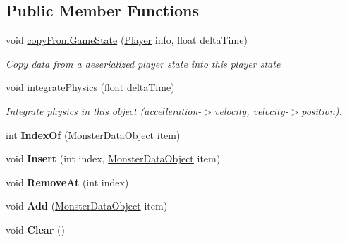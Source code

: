 \subsection*{Public Member Functions}
\begin{DoxyCompactItemize}
\item 
void \hyperlink{class_game_state_1_1_player_ace7e3625cf1996b8c56bcafae36673af}{copy\-From\-Game\-State} (\hyperlink{class_game_state_1_1_player}{Player} info, float delta\-Time)
\begin{DoxyCompactList}\small\item\em Copy data from a deserialized player state into this player state \end{DoxyCompactList}\item 
void \hyperlink{class_game_state_1_1_player_a59ac624b5378e8253ac70d827febfe6a}{integrate\-Physics} (float delta\-Time)
\begin{DoxyCompactList}\small\item\em Integrate physics in this object (accelleration-\/$>$velocity, velocity-\/$>$position). \end{DoxyCompactList}\item 
\hypertarget{class_game_state_1_1_player_a3ab6c2f1d15057b161ba0cba271fd9d3}{int {\bfseries Index\-Of} (\hyperlink{class_monster_data_object}{Monster\-Data\-Object} item)}\label{class_game_state_1_1_player_a3ab6c2f1d15057b161ba0cba271fd9d3}

\item 
\hypertarget{class_game_state_1_1_player_a84cdeefa239fade5ab90b42b3d55bda8}{void {\bfseries Insert} (int index, \hyperlink{class_monster_data_object}{Monster\-Data\-Object} item)}\label{class_game_state_1_1_player_a84cdeefa239fade5ab90b42b3d55bda8}

\item 
\hypertarget{class_game_state_1_1_player_a971bad69d0ef56fbd860c71ed1b56dae}{void {\bfseries Remove\-At} (int index)}\label{class_game_state_1_1_player_a971bad69d0ef56fbd860c71ed1b56dae}

\item 
\hypertarget{class_game_state_1_1_player_ad791ddd2f697e5237c6e04c7fc5c1e5f}{void {\bfseries Add} (\hyperlink{class_monster_data_object}{Monster\-Data\-Object} item)}\label{class_game_state_1_1_player_ad791ddd2f697e5237c6e04c7fc5c1e5f}

\item 
\hypertarget{class_game_state_1_1_player_a732e5b36f28a1fa3aa998fb5659a986a}{void {\bfseries Clear} ()}\label{class_game_state_1_1_player_a732e5b36f28a1fa3aa998fb5659a986a}


\end{DoxyCompactItemize}
